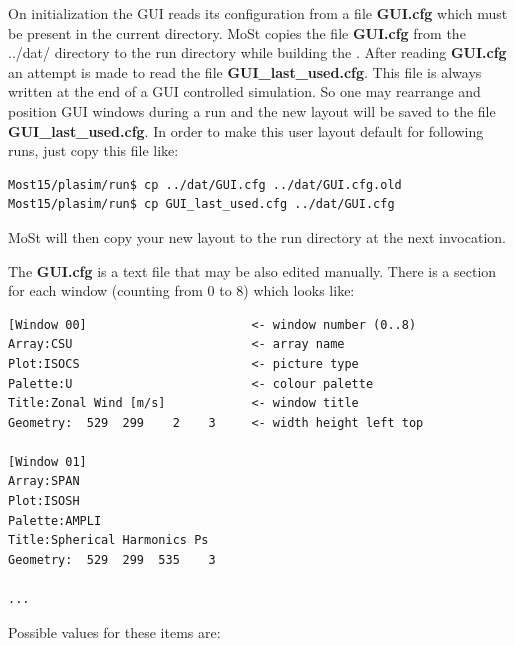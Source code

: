 On initialization the GUI reads its configuration from a file
{\bf GUI.cfg} which must be present in the current directory.
MoSt copies the file {\bf GUI.cfg} from the ../dat/ directory
to the run directory while building the {\model}.
After reading {\bf GUI.cfg} an attempt is made to read the file
{\bf GUI\_last\_used.cfg}. This file is always written at the end
of a GUI controlled simulation. So one may rearrange and position
GUI windows during a run and the new layout will be saved to the
file {\bf GUI\_last\_used.cfg}. In order to make this user
layout default for following runs, just copy this file like:
\begin{verbatim}
Most15/plasim/run$ cp ../dat/GUI.cfg ../dat/GUI.cfg.old
Most15/plasim/run$ cp GUI_last_used.cfg ../dat/GUI.cfg
\end{verbatim}
MoSt will then copy your new layout to the run directory at 
the next invocation.

The {\bf GUI.cfg} is a text file that may be also edited manually.
There is a section for each window (counting from 0 to 8) which
looks like:

\begin{verbatim}
[Window 00]                       <- window number (0..8)
Array:CSU                         <- array name
Plot:ISOCS                        <- picture type
Palette:U                         <- colour palette
Title:Zonal Wind [m/s]            <- window title
Geometry:  529  299    2    3     <- width height left top

[Window 01]
Array:SPAN
Plot:ISOSH
Palette:AMPLI
Title:Spherical Harmonics Ps
Geometry:  529  299  535    3

...

\end{verbatim}

Possible values for these items are:

